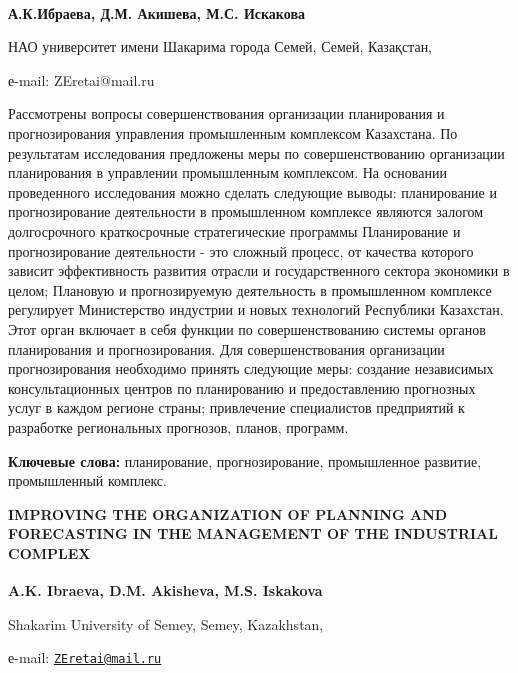 {\bfseries А.К.Ибраева\textsuperscript{\envelope }, Д.М. Акишева, М.С. Искакова}

НАО университет имени Шакарима города Семей, Семей, Казақстан,

е-mail: ZEretai@mail.ru

Рассмотрены вопросы совершенствования организации планирования и
прогнозирования управления промышленным комплексом Казахстана. По
результатам исследования предложены меры по совершенствованию
организации планирования в управлении промышленным комплексом. На
основании проведенного исследования можно сделать следующие выводы:
планирование и прогнозирование деятельности в промышленном комплексе
являются залогом долгосрочного краткосрочные стратегические программы
Планирование и прогнозирование деятельности - это сложный процесс, от
качества которого зависит эффективность развития отрасли и
государственного сектора экономики в целом; Плановую и прогнозируемую
деятельность в промышленном комплексе регулирует Министерство индустрии
и новых технологий Республики Казахстан. Этот орган включает в себя
функции по совершенствованию системы органов планирования и
прогнозирования. Для совершенствования организации прогнозирования
необходимо принять следующие меры: создание независимых консультационных
центров по планированию и предоставлению прогнозных услуг в каждом
регионе страны; привлечение специалистов предприятий к разработке
региональных прогнозов, планов, программ.

{\bfseries Ключевые слова:} планирование, прогнозирование, промышленное
развитие, промышленный комплекс.

{\bfseries IMPROVING THE ORGANIZATION OF PLANNING AND FORECASTING IN THE
MANAGEMENT OF THE INDUSTRIAL COMPLEX}

{\bfseries A.K. Ibraeva\textsuperscript{\envelope }, D.M. Akisheva, M.S. Iskakova}

Shakarim University of Semey, Semey, Kazakhstan,

е-mail: \href{mailto:ZEretai@mail.ru}{\nolinkurl{ZEretai@mail.ru}}

